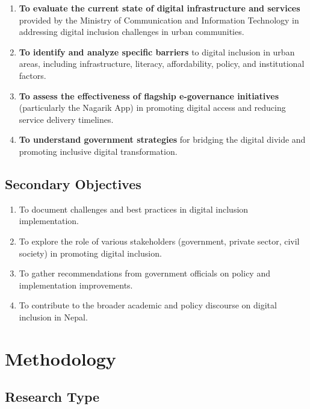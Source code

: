 \documentclass[12pt,a4paper]{article}
\begin{document}
\begin{enumerate}
    \item \textbf{To evaluate the current state of digital infrastructure and services} provided by the Ministry of Communication and Information Technology in addressing digital inclusion challenges in urban communities.
    
    \item \textbf{To identify and analyze specific barriers} to digital inclusion in urban areas, including infrastructure, literacy, affordability, policy, and institutional factors.
    
    \item \textbf{To assess the effectiveness of flagship e-governance initiatives} (particularly the Nagarik App) in promoting digital access and reducing service delivery timelines.
    
    \item \textbf{To understand government strategies} for bridging the digital divide and promoting inclusive digital transformation.
\end{enumerate}

\subsection{Secondary Objectives}

\begin{enumerate}[resume]
    \item To document challenges and best practices in digital inclusion implementation.
    
    \item To explore the role of various stakeholders (government, private sector, civil society) in promoting digital inclusion.
    
    \item To gather recommendations from government officials on policy and implementation improvements.
    
    \item To contribute to the broader academic and policy discourse on digital inclusion in Nepal.
\end{enumerate}

\section{Methodology}
\label{sec:methodology}

\subsection{Research Type}
\end{document}
